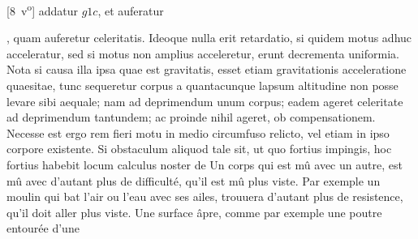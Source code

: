 [8~v\textsuperscript{o}]
addatur $\displaystyle g1c$, et auferatur\rule[-4mm]{0mm}{10mm}
,
quam auferetur celeritatis\protect{}.
Ideoque nulla erit retardatio\protect{}, si quidem motus adhuc acceleratur, sed si motus non amplius acceleretur, erunt decrementa uniformia.
\pend
\count{}
\pstart
Nota si causa illa ipsa quae est gravitatis\protect{}, esset etiam gravitationis acceleratione\protect{} quaesitae,
tunc sequeretur corpus a quantacunque lapsum altitudine non posse levare sibi aequale; nam
ad deprimendum unum corpus; eadem ageret celeritate ad deprimendum tantundem; ac proinde nihil ageret, ob compensationem.
Necesse est ergo rem fieri
motu in medio circumfuso relicto, vel etiam in ipso corpore existente.
\pend
\pstart
Si obstaculum aliquod tale sit, ut quo fortius impingis, hoc fortius
habebit locum calculus noster de
\protect{}
Un corps qui est m\^{u} avec
un autre, est m\^{u} avec d'autant plus de difficult\'{e}, qu'il est m\^{u} plus viste.
Par exemple un moulin qui bat l'air ou l'eau avec ses ailes, trouuera d'autant plus de resistence\protect{}, qu'il doit aller plus viste.
Une surface \^{a}pre, comme par exemple une poutre entour\'{e}e d'une
\pend
\newpage
\count{}
\count{}
\count{}